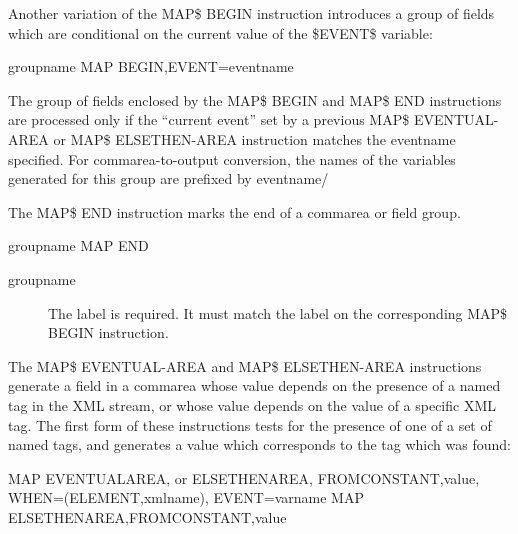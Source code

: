 \documentclass[letterpaper,10pt,english]{sphinxmanual}
\begin{document}
Another variation of the MAP\$ BEGIN instruction introduces a group of fields which are conditional on the current value of the \$EVENT\$ variable:

\begin{sphinxVerbatim}[commandchars=\\\{\}]
groupname MAP\PYGZdl{} BEGIN,EVENT=\PYGZsq{}eventname\PYGZsq{}
\end{sphinxVerbatim}

The group of fields enclosed by the MAP\$ BEGIN and MAP\$ END instructions are processed only if the “current event” set by a previous MAP\$ EVENTUAL-AREA or MAP\$ ELSETHEN-AREA instruction matches the eventname specified. For commarea-to-output conversion, the names of the variables generated for this group are prefixed by eventname/


The MAP\$ END instruction marks the end of a commarea or field group.

\begin{sphinxVerbatim}[commandchars=\\\{\}]
groupname MAP\PYGZdl{} END
\end{sphinxVerbatim}
\begin{description}
\item[{groupname}] \leavevmode
The label is required. It must match the label on the corresponding MAP\$ BEGIN instruction.

\end{description}
\label{\detokenize{User_Guide:v457ug-map-eventual-elsethen}}

The MAP\$ EVENTUAL-AREA and MAP\$ ELSETHEN-AREA instructions generate a field in a commarea whose value depends on the presence of a named tag in the XML stream, or whose value depends on the value of a specific XML tag.
The first form of these instructions tests for the presence of one of a set of named tags, and generates a value which corresponds to the tag which was found:

\begin{sphinxVerbatim}[commandchars=\\\{\}]
MAP\PYGZdl{} EVENTUAL\PYGZhy{}AREA, or ELSETHEN\PYGZhy{}AREA,
FROM\PYGZhy{}CONSTANT,\PYGZsq{}value\PYGZsq{},
WHEN=(ELEMENT,\PYGZsq{}xmlname\PYGZsq{}),
EVENT=\PYGZsq{}varname\PYGZsq{}
MAP\PYGZdl{} ELSETHEN\PYGZhy{}AREA,FROM\PYGZhy{}CONSTANT,\PYGZsq{}value\PYGZsq{}
\end{sphinxVerbatim}
\end{document}
